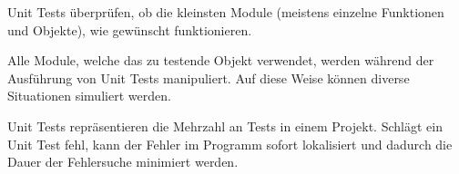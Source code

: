 Unit Tests überprüfen, ob die kleinsten Module (meistens einzelne Funktionen und Objekte), 
wie gewünscht funktionieren. 

Alle Module, welche das zu testende Objekt verwendet, werden während der Ausführung von Unit Tests manipuliert.
Auf diese Weise können diverse Situationen simuliert werden.

Unit Tests repräsentieren die Mehrzahl an Tests in einem Projekt. Schlägt ein Unit Test fehl, 
kann der Fehler im Programm sofort lokalisiert und dadurch die Dauer der Fehlersuche minimiert werden.